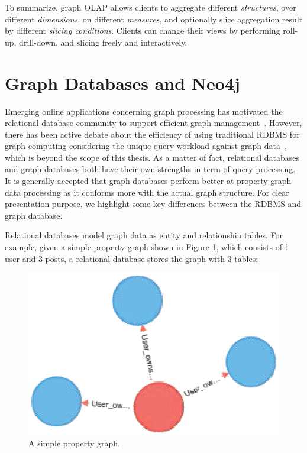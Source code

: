 To summarize, graph OLAP allows clients to aggregate different \textit{structures}, over different \textit{dimensions}, on different \textit{measures}, and optionally slice aggregation result by different \textit{slicing conditions}. Clients can change their views by performing roll-up, drill-down, and slicing freely and interactively.


\section{Graph Databases and Neo4j}
 Emerging online applications concerning graph processing has motivated the relational database community to support efficient graph management~\cite{}. However, there has been active debate about the efficiency of using traditional RDBMS for graph computing considering the unique query workload against graph data~\cite{}, which is beyond the scope of this thesis. As a matter of fact, relational databases and graph databases both have their own strengths in term of query processing.  It is generally accepted that graph databases perform better at property graph data processing as it conforms more with the actual graph structure. For clear presentation purpose, we highlight some key differences between the RDBMS and graph database.


Relational databases  model graph data as entity and relationship tables. For example, given a simple property graph shown in Figure \ref{fig:2:4}, which consists of 1 user and 3 posts, a relational database stores the graph with 3 tables:

\begin{figure}[H]
\centering
\includegraphics[scale=0.9]{pic/4.eps}
\caption{A simple property graph.}
\label{fig:2:4}
\end{figure}


